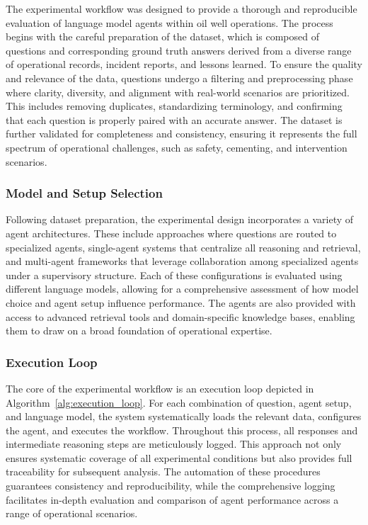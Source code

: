                 The experimental workflow was designed to provide a thorough and reproducible evaluation of language model agents within oil well operations. The process begins with the careful preparation of the dataset, which is composed of questions and corresponding ground truth answers derived from a diverse range of operational records, incident reports, and lessons learned. To ensure the quality and relevance of the data, questions undergo a filtering and preprocessing phase where clarity, diversity, and alignment with real-world scenarios are prioritized. This includes removing duplicates, standardizing terminology, and confirming that each question is properly paired with an accurate answer. The dataset is further validated for completeness and consistency, ensuring it represents the full spectrum of operational challenges, such as safety, cementing, and intervention scenarios.

            \subsubsection{Model and Setup Selection}

                Following dataset preparation, the experimental design incorporates a variety of agent architectures. These include approaches where questions are routed to specialized agents, single-agent systems that centralize all reasoning and retrieval, and multi-agent frameworks that leverage collaboration among specialized agents under a supervisory structure. Each of these configurations is evaluated using different language models, allowing for a comprehensive assessment of how model choice and agent setup influence performance. The agents are also provided with access to advanced retrieval tools and domain-specific knowledge bases, enabling them to draw on a broad foundation of operational expertise.

            \subsubsection{Execution Loop}

                The core of the experimental workflow is an execution loop depicted in Algorithm~\ref{alg:execution_loop}. For each combination of question, agent setup, and language model, the system systematically loads the relevant data, configures the agent, and executes the workflow. Throughout this process, all responses and intermediate reasoning steps are meticulously logged. This approach not only ensures systematic coverage of all experimental conditions but also provides full traceability for subsequent analysis. The automation of these procedures guarantees consistency and reproducibility, while the comprehensive logging facilitates in-depth evaluation and comparison of agent performance across a range of operational scenarios.

